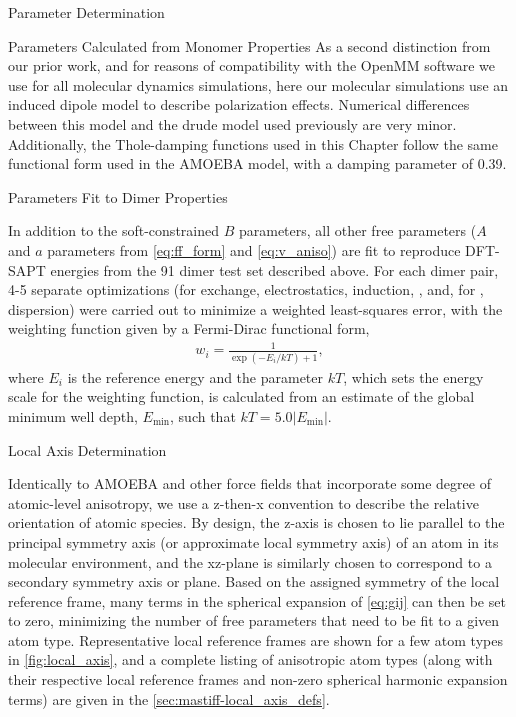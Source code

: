 \begin{subsection}{Parameter Determination}
\begin{subsubsection}{Parameters Calculated from Monomer Properties}
As a second distinction from our prior work, and for reasons of compatibility
with the OpenMM\cite{Eastman2013} software we use for all molecular dynamics
simulations, here our molecular simulations use an induced
dipole model to describe polarization effects.
Numerical differences between this
model and the drude model used previously are very minor.
Additionally, the Thole-damping functions used in this Chapter follow
the same functional form used in the AMOEBA model,\cite{Ren2003} with a damping
parameter of 0.39. 

\end{subsubsection}
\begin{subsubsection}{Parameters Fit to Dimer Properties}

In addition to the soft-constrained $B$ parameters, all other free parameters
($A$ and $a$ parameters from \cref{eq:ff_form}
and \cref{eq:v_aniso}) are fit to reproduce
DFT-SAPT energies from the 91 dimer test set described above. For each dimer
pair, 4-5 separate optimizations (for exchange, electrostatics, induction,
\dhf, and, for \mastiff, dispersion) were carried out to minimize a weighted
least-squares error, with the weighting function given by a Fermi-Dirac functional
form,
%
\begin{align}
\label{eq:weighting-function}
w_i = \frac{1}{\exp(-E_i/kT) + 1},
\end{align}
%
where $E_i$ is the reference energy and 
the parameter $kT$, which sets the energy scale for the
weighting function, is calculated from an estimate of the global minimum well
depth, 
$E_{\text{min}}$, such that
$kT = 5.0 |E_{\text{min}}|$. 

\end{subsubsection}
\begin{subsubsection}{Local Axis Determination}

Identically to AMOEBA and other force fields that incorporate some degree of
atomic-level anisotropy,\cite{Ren2003,Day2003,Totton2010} we use a z-then-x
convention to describe the relative orientation of atomic species. By design,
the z-axis is chosen to lie parallel to the principal symmetry axis (or
approximate local symmetry axis) of an atom
in its molecular environment, and the xz-plane is similarly chosen to
correspond to a secondary symmetry axis or plane. Based on the assigned symmetry
of the local reference frame, many terms in the
spherical expansion of \cref{eq:gij} can then be set to zero, minimizing the
number of free parameters that need to be fit to a given atom type. 
Representative local reference frames are shown for a few atom types in
\cref{fig:local_axis}, and a complete listing of anisotropic atom types
(along with their respective local reference frames and non-zero spherical
harmonic expansion terms)
are given in the \cref{sec:mastiff-local_axis_defs}.


\end{subsubsection}
\end{subsection}

